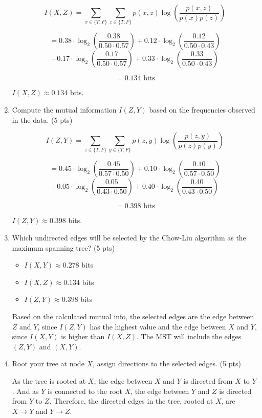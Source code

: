 \documentclass[a4paper]{article}
\theoremstyle{definition}
\newenvironment{soln}{
	\leavevmode\color{blue}\ignorespaces
}{}
\begin{document}
\begin{enumerate}
\begin{soln}
		\[
		I(X, Z) = \sum_{x \in \{T, F\}} \sum_{z \in \{T, F\}} p(x, z) \log\left(\frac{p(x, z)}{p(x)p(z)}\right)
		\]

		\[
		= 0.38 \cdot \log_2\left(\frac{0.38}{0.50 \cdot 0.57}\right) + 0.12 \cdot \log_2\left(\frac{0.12}{0.50 \cdot 0.43}\right)
		\]
		\[
		+ 0.17 \cdot \log_2\left(\frac{0.17}{0.50 \cdot 0.57}\right) + 0.33 \cdot \log_2\left(\frac{0.33}{0.50 \cdot 0.43}\right)
		\]

		\[
		= 0.134 \text{ bits}
		\]

		$I(X, Z) \approx 0.134$ bits.


	\end{soln}
	\item Compute the mutual information $I(Z, Y)$ based on the frequencies observed in the data. (5 pts)
	\begin{soln}
		\[
		I(Z, Y) = \sum_{z \in \{T, F\}} \sum_{y \in \{T, F\}} p(z, y) \log\left(\frac{p(z, y)}{p(z)p(y)}\right)
		\]

		\[
		= 0.45 \cdot \log_2\left(\frac{0.45}{0.57 \cdot 0.50}\right) + 0.10 \cdot \log_2\left(\frac{0.10}{0.57 \cdot 0.50}\right)
		\]
		\[
		+ 0.05 \cdot \log_2\left(\frac{0.05}{0.43 \cdot 0.50}\right) + 0.40 \cdot \log_2\left(\frac{0.40}{0.43 \cdot 0.50}\right)
		\]

		\[
		= 0.398 \text{ bits}
		\]

		$I(Z, Y) \approx 0.398$ bits.
	\end{soln}
	\item Which undirected edges will be selected by the Chow-Liu algorithm as the maximum spanning tree? (5 pts)
	\begin{soln}
		\begin{itemize}
			\item $I(X, Y) \approx 0.278$ bits
			\item $I(X, Z) \approx 0.134$ bits
			\item $I(Z, Y) \approx 0.398$ bits
		\end{itemize}

		Based on the calculated mutual info, the selected edges are the edge between $Z$ and $Y$, since $I(Z, Y)$ has the highest value and the 
		edge between $X$ and $Y$, since $I(X, Y)$ is higher than $I(X, Z)$. The MST will include the edges $(Z, Y)$ and $(X, Y)$.
	\end{soln}
	\item Root your tree at node $X$, assign directions to the selected edges. (5 pts) \\
	\begin{soln}
		As the tree is rooted at $X$, the edge between $X$ and $Y$ is directed from $X$ to $Y$. 
		And as $Y$ is connected to the root $X$, the edge between $Y$ and $Z$ is directed from $Y$ to $Z$. 
		Therefore, the directed edges in the tree, rooted at $X$, are $X \rightarrow Y$ and $Y \rightarrow Z$.

	\end{soln}
\end{enumerate}

	
	
\end{document}
